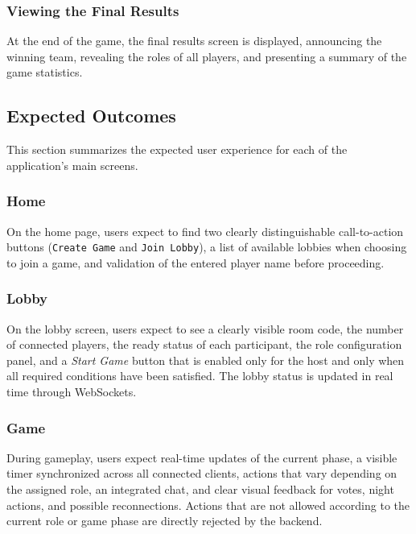 \documentclass{scrartcl}
\begin{document}
\subsubsection{Viewing the Final Results}

At the end of the game, the final results screen is displayed, announcing the winning team, revealing the roles of all players, and presenting a summary of the game statistics.

\subsection{Expected Outcomes}
\label{sec:expected-outcomes}

This section summarizes the expected user experience for each of the application's main screens.

\subsubsection{Home}

On the home page, users expect to find two clearly distinguishable call-to-action buttons (\texttt{Create Game} and \texttt{Join Lobby}), a list of available lobbies when choosing to join a game, and validation of the entered player name before proceeding.

\subsubsection{Lobby}

On the lobby screen, users expect to see a clearly visible room code, the number of connected players, the ready status of each participant, the role configuration panel, and a \emph{Start Game} button that is enabled only for the host and only when all required conditions have been satisfied. The lobby status is updated in real time through WebSockets.

\subsubsection{Game}

During gameplay, users expect real-time updates of the current phase, a visible timer synchronized across all connected clients, actions that vary depending on the assigned role, an integrated chat, and clear visual feedback for votes, night actions, and possible reconnections. Actions that are not allowed according to the current role or game phase are directly rejected by the backend.
\end{document}
